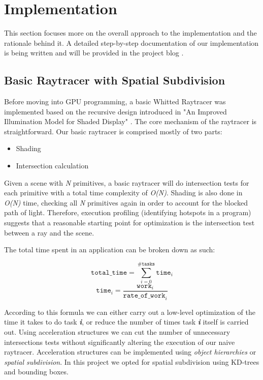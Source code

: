\documentclass[letterpaper, 10 pt, conference]{ieeeconf}  %
\begin{document}
\section{Implementation}
This section focuses more on the overall approach to the implementation and the rationale behind it. A detailed step-by-step documentation of our implementation is being written and will be provided in the project blog \cite{c2}.
\subsection{Basic Raytracer with Spatial Subdivision}
 Before moving into GPU programming, a basic Whitted Raytracer was implemented based on the recursive design introduced in "An Improved Illumination Model for Shaded Display"\cite{c1} . The core mechanism of the raytracer is straightforward. Our basic raytracer is comprised mostly of two parts:
 
\begin{itemize}
\item Shading
\item Intersection calculation
\end{itemize}
 
Given a scene with \textit{N} primitives, a basic raytracer will do intersection tests for each primitive with a total time complexity of \textit{O(N)}. Shading is also done in \textit{O(N)} time, checking all \textit{N} primitives again in order to account for the blocked path of light. Therefore, execution profiling (identifying hotspots in a program) suggests that a reasonable starting point for optimization is the intersection test between a ray and the scene.

The total time spent in an application can be broken down as such\cite{c3}:

\[\mathtt{total\_time} = \sum_{i=0} ^{\#\mathtt{tasks}}\mathtt{time}_i\]
\[\mathtt{time}_i= \frac{\mathtt{work}_i}{\mathtt{rate\_of\_work}_i}\]

According to this formula we can either carry out a low-level optimization of the time it takes to do task \textit{\textbf{i}}, or reduce the number of times task \textit{\textbf{i}} itself is carried out. Using acceleration structures we can cut the number of unnecessary intersections tests without significantly altering the execution of our naive raytracer. Acceleration structures can be implemented using \textit{object hierarchies} or \textit{spatial subdivision}. In this project we opted for spatial subdivision using KD-trees and bounding boxes.
\end{document}
